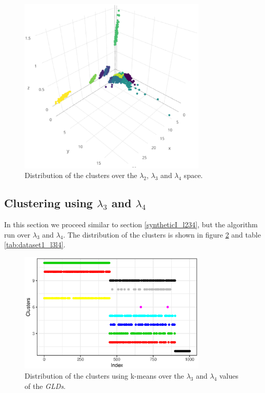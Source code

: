 \begin{figure}[H]
    \centering
    \includegraphics[width=0.8\textwidth]{img/gld_clustering/datasetI/l2l3l4/l2_l3_l4.eps}
    \caption{Distribution of the clusters over the $\lambda_{2}$, $\lambda_{3}$ and $\lambda_{4}$ space.}
    \label{fig:dataset1_l2l3l4_l2_l3_l4}
\end{figure}

\subsection{Clustering using $\lambda_{3}$ and $\lambda_{4}$}\label{syntheticI_l34}

In this section we proceed similar to section \ref{syntheticI_l234}, but the algorithm run over $\lambda_{3}$ and $\lambda_{4}$. The distribution of the clusters is shown in figure \ref{fig:dataset1_l3l4} and table \ref{tab:dataset1_l3l4}.

\begin{figure}[H]
    \centering
    \includegraphics[width=0.8\textwidth]{img/gld_clustering/datasetI/l3l4/normal_exponential_uniform3.eps}
    \caption{Distribution of the clusters using k-means over the $\lambda_{3}$ and $\lambda_{4}$ values of the \textit{GLDs}.}
    \label{fig:dataset1_l3l4}
\end{figure}

